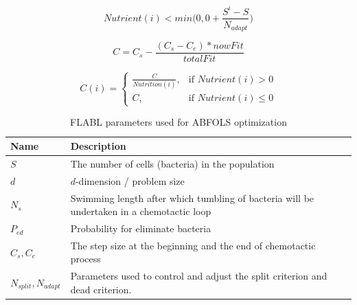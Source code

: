 \documentclass[runningheads]{llncs}
\begin{document}
\begin{equation} \label{eq_dead}
Nutrient(i) < \displaystyle min\Big( 0, 0 + \frac{S^i - S}{ N_{adapt} } \Big)
\end{equation}

\begin{equation} \label{eq_step_size_general}
C = \displaystyle C_s - \frac{ (C_s - C_e) * nowFit }{ totalFit } 
\end{equation}

\begin{equation} \label{eq_step_size_i}
C(i) = \begin{cases}  \displaystyle \frac{C}{Nutrition(i)} , & \mbox{if } Nutrient(i) > 0\\ C, & \mbox{if } Nutrient(i) \leq 0 \end{cases}
\end{equation}
\normalsize

\begin{table}[!h]
\begin{center}
\begin{tabular}{ |C{2cm}| C{10cm} | } 
\hline
\textbf{Name} & \textbf{Description} \\ \hline
$S$ & The number of cells (bacteria) in the population \\ \hline
$d$ & $d$-dimension / problem size \\ \hline
$N_s$ & Swimming length after which tumbling of bacteria will be undertaken in a chemotactic loop \\ \hline
$P_{ed}$ & Probability for eliminate bacteria \\ \hline
$C_s, C_e$ & The step size at the beginning and the end of chemotactic process\\ \hline
$N_{split}, N_{adapt}$ & Parameters used to control and adjust the split criterion and dead criterion. \\ \hline
\end{tabular}
\end{center}
\caption{FLABL parameters used for ABFOLS optimization}
\label{table:bfo_paras}
\end{table}
\end{document}
